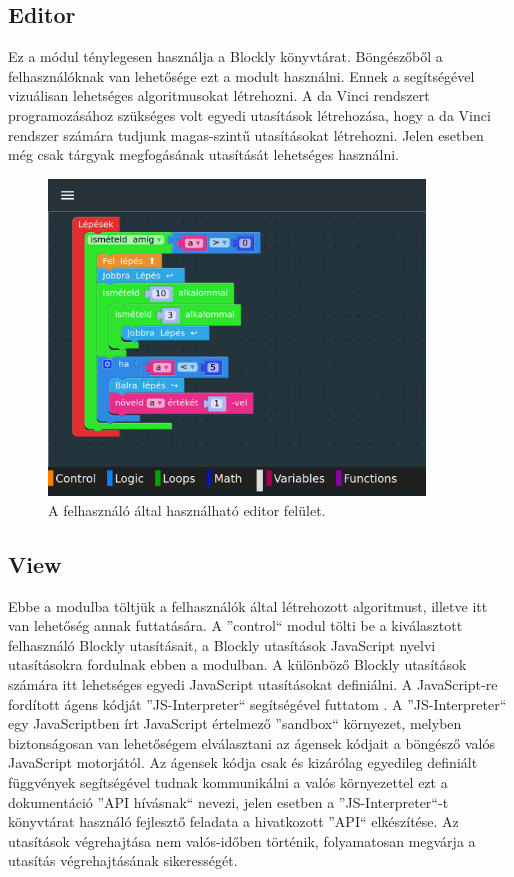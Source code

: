\documentclass[12pt,a4paper,oneside]{report} %
\begin{document}
\subsection{Editor}
Ez a módul ténylegesen használja a Blockly könyvtárat. Böngészőből a felhasználóknak van lehetősége ezt a modult használni. Ennek a segítségével vizuálisan lehetséges algoritmusokat létrehozni. A da Vinci rendszert programozásához szükséges volt egyedi utasítások létrehozása, hogy a da Vinci rendszer számára tudjunk magas-szintű utasításokat létrehozni. Jelen esetben még csak tárgyak megfogásának utasítását lehetséges használni.
\begin{figure}[H]
	\centering
	\label{fig:myblockly}
	\includegraphics[width=10cm]{myblockly}
	\caption{A felhasználó által használható editor felület. }
\end{figure}

\subsection{View}
Ebbe a modulba töltjük  a felhasználók által létrehozott algoritmust, illetve itt van lehetőség annak futtatására. A ''control`` modul tölti be a kiválasztott felhasználó Blockly utasításait, a Blockly utasítások JavaScript nyelvi utasításokra fordulnak ebben a modulban. A különböző Blockly utasítások számára itt lehetséges egyedi JavaScript utasításokat definiálni. A JavaScript-re fordított ágens kódját ''JS-Interpreter`` segítségével futtatom \cite{BibEntry2020Feb}. A ''JS-Interpreter`` egy JavaScriptben írt JavaScript értelmező ''sandbox`` környezet, melyben biztonságosan van lehetőségem elválasztani az ágensek kódjait a böngésző valós JavaScript motorjától. Az ágensek kódja csak és kizárólag egyedileg definiált függvények segítségével tudnak kommunikálni a valós környezettel ezt a dokumentáció ''API hívásnak`` nevezi, jelen esetben a ''JS-Interpreter``-t könyvtárat használó fejlesztő feladata a hivatkozott ''API`` elkészítése. Az utasítások végrehajtása nem valós-időben történik, folyamatosan megvárja a utasítás végrehajtásának sikerességét. 
\end{document}
